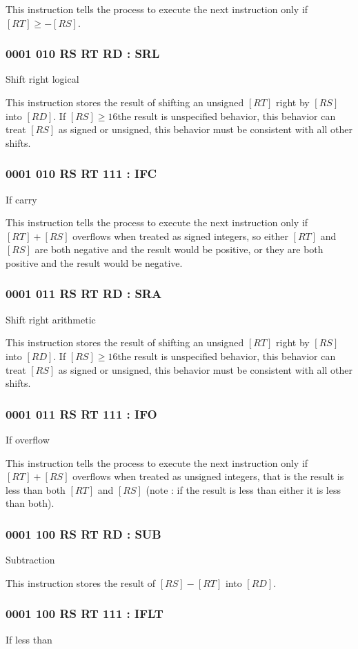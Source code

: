 \documentclass[12pt,letterpaper]{report}
\newcommand{\reg}[1]{\left[#1\right]}
\begin{document}
This instruction tells the process to execute the next instruction only if $\reg{RT} \geq -\reg{RS}$.
\subsubsection{0001 010  RS  RT  RD : SRL}
Shift right logical

This instruction stores the result of shifting an unsigned $\reg{RT}$ right by $\reg{RS}$ into $\reg{RD}$. If $\reg{RS} \geq 16$the result is unspecified behavior, this behavior can treat $\reg{RS}$ as signed or unsigned, this behavior must be consistent with all other shifts.
\subsubsection{0001 010  RS  RT 111 : IFC}
If carry

This instruction tells the process to execute the next instruction only if $\reg{RT} + \reg{RS}$ overflows when treated as signed integers, so either $\reg{RT}$ and $\reg{RS}$ are both negative and the result would be positive, or they are both positive and the result would be negative.
\subsubsection{0001 011  RS  RT  RD : SRA}
Shift right arithmetic

This instruction stores the result of shifting an unsigned $\reg{RT}$ right by $\reg{RS}$ into $\reg{RD}$. If $\reg{RS} \geq 16$the result is unspecified behavior, this behavior can treat $\reg{RS}$ as signed or unsigned, this behavior must be consistent with all other shifts.
\subsubsection{0001 011  RS  RT 111 : IFO}
If overflow

This instruction tells the process to execute the next instruction only if $\reg{RT} + \reg{RS}$ overflows when treated as unsigned integers, that is the result is less than both $\reg{RT}$ and $\reg{RS}$ (note : if the result is less than either it is less than both).
\subsubsection{0001 100  RS  RT  RD : SUB}
Subtraction

This instruction stores the result of $\reg{RS} - \reg{RT}$ into $\reg{RD}$.
\subsubsection{0001 100  RS  RT 111 : IFLT}
If less than
\end{document}

